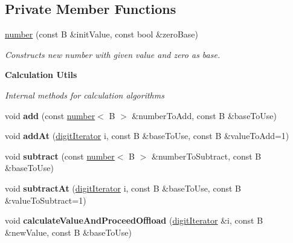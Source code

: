 \subsection*{Private Member Functions}
\begin{DoxyCompactItemize}
\item 
\hyperlink{classcjr_1_1number_a58a4b2ff967a9637d426403d3a93ad07}{number} (const B \&init\-Value, const bool \&zero\-Base)
\begin{DoxyCompactList}\small\item\em Constructs new number with given value and zero as base. \end{DoxyCompactList}\end{DoxyCompactItemize}
\begin{Indent}{\bf Calculation Utils}\par
{\em Internal methods for calculation algorithms }\begin{DoxyCompactItemize}
\item 
\hypertarget{classcjr_1_1number_a13f235e4c96edbddafe53b885840325b}{void {\bfseries add} (const \hyperlink{classcjr_1_1number}{number}$<$ B $>$ \&number\-To\-Add, const B \&base\-To\-Use)}\label{classcjr_1_1number_a13f235e4c96edbddafe53b885840325b}

\item 
\hypertarget{classcjr_1_1number_a14cef80c954c85ab84000475ecde09b9}{void {\bfseries add\-At} (\hyperlink{classcjr_1_1number_a137416a57d724f8b6a5c14bab7c6802b}{digit\-Iterator} i, const B \&base\-To\-Use, const B \&value\-To\-Add=1)}\label{classcjr_1_1number_a14cef80c954c85ab84000475ecde09b9}

\item 
\hypertarget{classcjr_1_1number_a2a662f36f05c14a39d16e576606cb5d0}{void {\bfseries subtract} (const \hyperlink{classcjr_1_1number}{number}$<$ B $>$ \&number\-To\-Subtract, const B \&base\-To\-Use)}\label{classcjr_1_1number_a2a662f36f05c14a39d16e576606cb5d0}

\item 
\hypertarget{classcjr_1_1number_a6e7d57f93bbeca3854de659e91e2177f}{void {\bfseries subtract\-At} (\hyperlink{classcjr_1_1number_a137416a57d724f8b6a5c14bab7c6802b}{digit\-Iterator} i, const B \&base\-To\-Use, const B \&value\-To\-Subtract=1)}\label{classcjr_1_1number_a6e7d57f93bbeca3854de659e91e2177f}

\item 
\hypertarget{classcjr_1_1number_ad287607b202d339c2dd8ff31f23697ab}{void {\bfseries calculate\-Value\-And\-Proceed\-Offload} (\hyperlink{classcjr_1_1number_a137416a57d724f8b6a5c14bab7c6802b}{digit\-Iterator} \&i, const B \&new\-Value, const B \&base\-To\-Use)}\label{classcjr_1_1number_ad287607b202d339c2dd8ff31f23697ab}


\end{DoxyCompactItemize}
\end{Indent}
